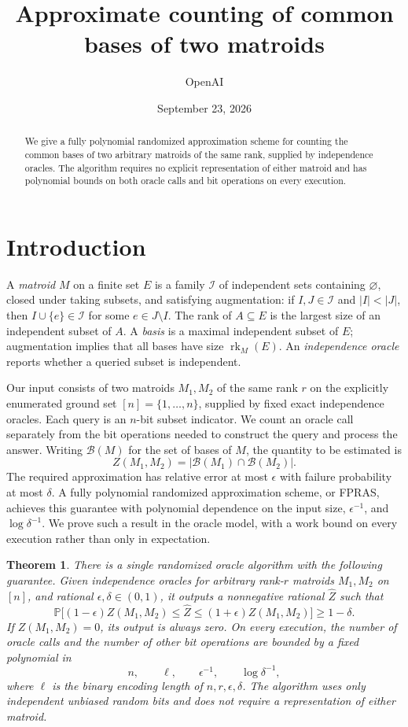 \documentclass[11pt]{article}
\title{Approximate counting of common bases of two matroids}
\author{OpenAI}
\date{September 23, 2026}
\newtheorem{theorem}{Theorem}[section]
\theoremstyle{definition}
\newcommand{\Prob}{\mathbb P}
\newcommand{\rank}{\operatorname{rk}}
\begin{document}
\maketitle
\begin{abstract}
We give a fully polynomial randomized approximation scheme for counting
the common bases of two arbitrary matroids of the same rank, supplied by
independence oracles. The algorithm requires no explicit representation
of either matroid and has polynomial bounds on both oracle calls and bit
operations on every execution.
\end{abstract}

\section{Introduction}

A \emph{matroid} $M$ on a finite set $E$ is a family $\mathcal I$ of
independent sets containing $\varnothing$, closed under taking subsets,
and satisfying augmentation: if $I,J\in\mathcal I$ and $|I|<|J|$, then
$I\cup\{e\}\in\mathcal I$ for some $e\in J\setminus I$.
The rank of $A\subseteq E$ is the largest size of an independent subset
of $A$.  A \emph{basis} is a maximal independent subset of $E$;
augmentation implies that all bases have size $\rank_M(E)$.
An \emph{independence oracle} reports whether a queried subset is
independent.

Our input consists of two matroids $M_1,M_2$ of the same rank $r$ on
the explicitly enumerated ground set $[n]=\{1,\ldots,n\}$, supplied by
fixed exact independence oracles.  Each query is an $n$-bit subset
indicator.  We count an oracle call separately from the bit operations
needed to construct the query and process the answer.  Writing
$\mathcal B(M)$ for the set of bases of $M$, the quantity to be estimated is
\[
 Z(M_1,M_2)=|\mathcal B(M_1)\cap\mathcal B(M_2)|.
\]
The required approximation has relative error at most $\epsilon$ with
failure probability at most $\delta$.  A fully polynomial randomized
approximation scheme, or FPRAS, achieves this guarantee with polynomial
dependence on the input size, $\epsilon^{-1}$, and
$\log\delta^{-1}$.  We prove such a result in the oracle model, with a
work bound on every execution rather than only in expectation.

\begin{theorem}\label{thm:main}
There is a single randomized oracle algorithm with the following
guarantee.  Given independence oracles for arbitrary rank-$r$ matroids
$M_1,M_2$ on $[n]$, and rational $\epsilon,\delta\in(0,1)$, it outputs a
nonnegative rational $\widehat Z$ such that
\[
 \Prob\bigl[(1-\epsilon)Z(M_1,M_2)\le\widehat Z
                  \le(1+\epsilon)Z(M_1,M_2)\bigr]\ge1-\delta.
\]
If $Z(M_1,M_2)=0$, its output is always zero.  On every execution, the
number of oracle calls and the number of other bit operations are bounded
by a fixed polynomial in
\[
 n,\qquad \ell,\qquad \epsilon^{-1},\qquad \log\delta^{-1},
\]
where $\ell$ is the binary encoding length of $n,r,\epsilon,\delta$.
The algorithm uses only independent unbiased random bits and does not
require a representation of either matroid.
\end{theorem}
\end{document}
